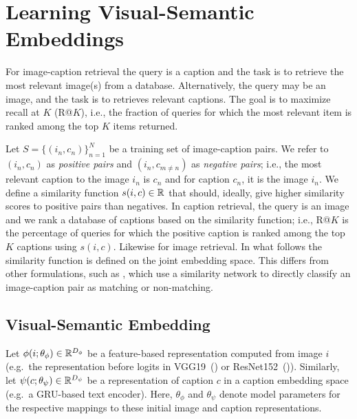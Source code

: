 \section{Learning Visual-Semantic Embeddings}



For image-caption retrieval the query is a caption and the task is to 
retrieve the most relevant image(s) from a database. Alternatively, the 
query may 
be an image, and the task is to retrieves relevant captions.  The goal is to 
maximize recall at $K$ (R@$K$), i.e., the fraction of queries for which the 
most relevant item is ranked among the top $K$ items returned.

Let $S=\{(i_n, c_n)\}^N_{n=1}$ be a training set of image-caption pairs.  
We refer to $(i_n, c_n)$ as {\em positive pairs}\/ and $(i_n, c_{m\neq n})$ as 
{\em negative pairs}\/; i.e., the most relevant caption to the image $i_n$ is 
$c_n$ and for caption $c_n$, it is the image $i_n$.  We define a similarity 
function $s(i, c)\in \mathbb{R}$ that should, ideally, give higher similarity 
scores to positive pairs than negatives.  In caption retrieval, the query 
is an image and we rank a database of captions based on the similarity 
function; i.e., R@$K$ is the percentage of queries for which the positive 
caption is ranked among the top $K$ captions using $s(i, c)$.  Likewise 
for image retrieval.  In what follows the similarity function is defined 
on the joint embedding space.  This differs from other formulations, such 
as \cite{wang2017learning}, which use a similarity network to directly 
classify an image-caption pair as matching or non-matching.

\vspace{-3mm}
\subsection{Visual-Semantic Embedding}

Let $\phi(i; \theta_\phi)\in \mathbb{R}^{D_\phi}$ be a feature-based representation 
computed from image $i\,$ (e.g.\ the representation before logits in 
VGG19~(\cite{simonyan2014very}) or ResNet152~(\cite{he2016deep})).  
Similarly, let $\psi(c; \theta_\psi) \in \mathbb{R}^{D_\psi}$ be a representation
of caption $c$ in a caption embedding space (e.g.\ a GRU-based text 
encoder).  Here, $\theta_\phi$ and $\theta_\psi$ denote model 
parameters for the respective mappings to these initial 
image and caption representations.

